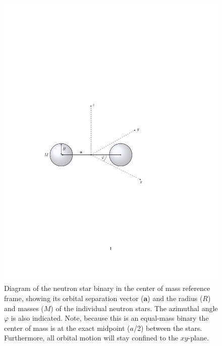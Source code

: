 \documentclass[11pt]{article}
\begin{document}
\begin{figure}[!h]
\begin{mdframed}
\centering
\includegraphics{stable_orbit/binary_diagram.pdf}
\caption{\label{fig:binary_diagram}Diagram of the neutron star binary in the center of mass reference frame, showing its orbital separation vector ($\mathbf{a}$) and the radius ($R$) and masses ($M$) of the individual neutron stars. The azimuthal angle $\varphi$ is also indicated. Note, because this is an equal-mass binary the center of mass is at the exact midpoint ($a$/2) between the stars. Furthermore, all orbital motion will stay confined to the $xy$-plane.}
\end{mdframed}
\end{figure}

\vspace{1000pt}
\end{document}
